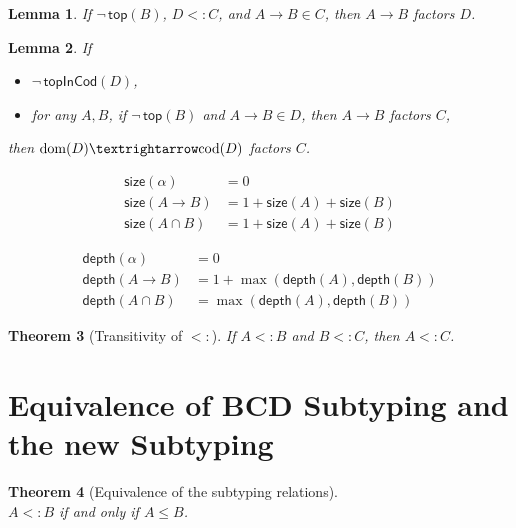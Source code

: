 \documentclass{article}
\newtheorem{theorem}{Theorem}
\newtheorem{lemma}[theorem]{Lemma}
\begin{document}
\begin{lemma}\label{lem:⊑-fun-inv}
  If $\neg\,\mathsf{top}(B)$,
  $D <: C$, and
  $A → B ∈ C$, then
  $A → B$ factors $D$.
\end{lemma}


\begin{lemma}\label{lem:sub-inv-trans}
  If
  \begin{itemize}
  \item $\neg\, \mathsf{topInCod}(D)$,
  \item for any $A,B$, if $\neg\,\mathsf{top}(B)$ and $A → B ∈ D$,
    then $A → B$ factors $C$,
  \end{itemize}
  then $\dom{D} → \cod{D}$ factors $C$.
\end{lemma}

\begin{align*}
  \mathsf{size}(\alpha) &= 0 \\
  \mathsf{size}(A → B) &= 1 + \mathsf{size}(A) + \mathsf{size}(B) \\
  \mathsf{size}(A ∩ B) &= 1 + \mathsf{size}(A) + \mathsf{size}(B)
\end{align*}

\begin{align*}
  \mathsf{depth}(\alpha) &= 0 \\
  \mathsf{depth}(A → B) &= 1 + \max(\mathsf{depth}(A), \mathsf{depth}(B)) \\
  \mathsf{depth}(A ∩ B) &= \max(\mathsf{depth}(A), \mathsf{depth}(B))
\end{align*}

\begin{theorem}[Transitivity of $<:$]\label{lem:sub-trans}
    If $A <: B$ and $B <: C$, then $A <: C$.
\end{theorem}

\section{Equivalence of BCD Subtyping and the new Subtyping}


\begin{theorem}[Equivalence of the subtyping relations]\ \\
  $A <: B$ if and only if $A ≤ B$.
\end{theorem}

\clearpage
\pagebreak



\end{document}
